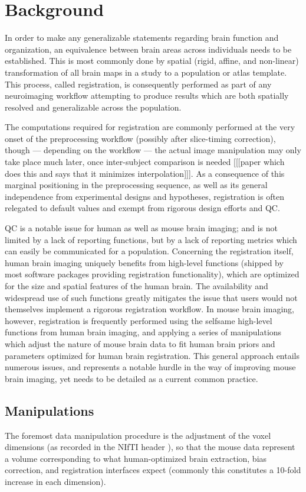 \section{Background}
\label{sec:bg}

In order to make any generalizable statements regarding brain function and organization, an equivalence between brain areas across individuals needs to be established.
This is most commonly done by spatial (rigid, affine, and non-linear) transformation of all brain maps in a study to a population or atlas template.
This process, called registration, is consequently performed as part of any neuroimaging workflow attempting to produce results which are both spatially resolved and generalizable across the population.

The computations required for registration are commonly performed at the very onset of the preprocessing workflow (possibly after slice-timing correction),
though --- depending on the workflow --- the actual image manipulation may only take place much later, once inter-subject comparison is needed [[[paper which does this and says that it minimizes interpolation]]].
As a consequence of this marginal positioning in the preprocessing sequence, as well as its general independence from experimental designs and hypotheses, registration is often relegated to default values and exempt from rigorous design efforts and QC.

QC is a notable issue for human as well as mouse brain imaging;
and is not limited by a lack of reporting functions, but by a lack of reporting metrics which can easily be communicated for a population.
Concerning the registration itself, human brain imaging uniquely benefits from high-level functions (shipped by most software packages providing registration functionality), which are optimized for the size and spatial features of the human brain.
The availability and widespread use of such functions greatly mitigates the issue that users would not themselves implement a rigorous registration workflow.
In mouse brain imaging, however, registration is frequently performed using the selfsame high-level functions from human brain imaging, and applying a series of manipulations which adjust the nature of mouse brain data to fit human brain priors and parameters optimized for human brain registration.
This general approach entails numerous issues, and represents a notable hurdle in the way of improving mouse brain imaging, yet needs to be detailed as a current common practice.

\subsection{Manipulations}
The foremost data manipulation procedure is the adjustment of the voxel dimensions (as recorded in the NIfTI header \cite{nifti}), so that the mouse data represent a volume corresponding to what human-optimized brain extraction, bias correction, and registration interfaces expect (commonly this constitutes a 10-fold increase in each dimension).

